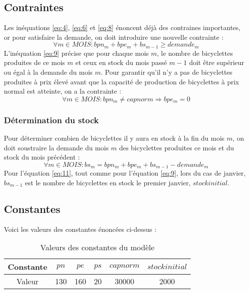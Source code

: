 \documentclass[11pt,a4paper]{report}
\begin{document}
\subsection*{Contraintes}
Les inéquations \eqref{eq:4}, \eqref{eq:6} et \eqref{eq:8} énoncent déjà des contraines importantes, or pour satisfaire la demande, on doit introduire une nouvelle contrainte :
\begin{equation}\label{eq:9}
\forall m \in MOIS : bpn_{m}+bpe_{m}+bs_{m-1}\geq demande_{m}
\end{equation}
L'inéquation \eqref{eq:9} précise que pour chaque mois $m$, le nombre de bicyclettes produites de ce mois $m$ et ceux en stock du mois passé $m-1$ doit être supérieur ou égal à la demande du mois $m$.\newline
Pour garantir qu'il n'y a pas de bicyclettes produites à prix élevé avant que la capacité de production de bicyclettes à prix normal est atteinte, on a la contrainte : 
\begin{equation}\label{eq:10}
\forall m \in MOIS : bpn_{m} \neq capnorm \Rightarrow bpe_{m}=0  
\end{equation}
\subsubsection*{Détermination du stock}
Pour déterminer combien de bicyclettes il y aura en stock à la fin du mois $m$, on doit soustraire la demande du mois $m$ des bicyclettes produites ce mois et du stock du mois précédent :
\begin{equation}\label{eq:11}
\forall m \in MOIS : bs_{m}=bpn_{m}+bpe_{m}+bs_{m-1}-demande_{m}
\end{equation}
Pour l'équation \eqref{eq:11}, tout comme pour l'équation \eqref{eq:9}, lors du cas de janvier, $bs_{m-1}$ est le nombre de bicyclettes en stock le premier janvier, $stockinitial$.
\subsection*{Constantes}
Voici les valeurs des constantes énoncées ci-dessus :
\begin{table}[h]
\centering
\caption{Valeurs des constantes du modèle}
\begin{tabular}{ |c |c| c| c| c| c|}
\hline
 Constante  & $pn$ & $pe$ & $ps$ & $capnorm$ & $stockinitial$ \\  
 \hline
 Valeur & 130 & 160 & 20 & 30000 & 2000  \\
 \hline
\end{tabular}
\end{table}
\end{document}
